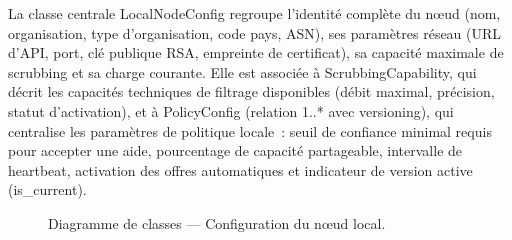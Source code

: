 La classe centrale {LocalNodeConfig} regroupe l'identité complète du nœud (nom, organisation, type d'organisation, code pays, ASN), ses paramètres réseau (URL d'API, port, clé publique RSA, empreinte de certificat), sa capacité maximale de scrubbing et sa charge courante. Elle est associée à {ScrubbingCapability}, qui décrit les capacités techniques de filtrage disponibles (débit maximal, précision, statut d'activation), et à {PolicyConfig} (relation 1..* avec versioning), qui centralise les paramètres de politique locale~: seuil de confiance minimal requis pour accepter une aide, pourcentage de capacité partageable, intervalle de heartbeat, activation des offres automatiques et indicateur de version active ({is\_current}).

\begin{figure}[H]
\centering
{}
\caption{Diagramme de classes — Configuration du nœud local.}
\label{fig:class_local}
\end{figure}

